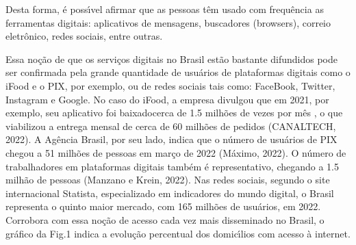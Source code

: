 \documentclass[
12pt,		%
openright,	%
twoside,  %
a4paper,			%
chapter=TITLE,		%
english,			%
french,				%
spanish,			%
brazil				%
]{USPSC-classe/USPSC}
\begin{document}
Desta forma, \'e poss\'{\i}vel afirmar que as pessoas t\^em usado com frequ\^encia  as ferramentas digitais: aplicativos de mensagens, buscadores (browsers), correio eletr\^onico, redes sociais, entre outras.

















Essa no\c{c}\~ao de que os servi\c{c}os digitais no Brasil est\~ao bastante difundidos pode ser confirmada pela grande quantidade de usu\'arios de plataformas digitais como o iFood e o PIX, por exemplo, ou de redes sociais tais como: FaceBook, Twitter, Instagram e Google. No caso do iFood, a empresa divulgou que em 2021, por exemplo, seu aplicativo foi \textquotedbl baixado\textquotedbl  cerca de 1.5 milh\~oes de vezes por m\^es , o que viabilizou a entrega mensal de cerca de 60 milh\~oes de pedidos  (CANALTECH, 2022). A Ag\^encia Brasil, por seu lado, indica que o n\'umero de usu\'arios de PIX chegou a 51 milh\~oes de pessoas em mar\c{c}o de 2022 (M\'aximo, 2022). O n\'umero de trabalhadores em plataformas digitais tamb\'em \'e representativo, chegando a 1.5 milh\~ao de pessoas  (Manzano e Krein, 2022). Nas redes sociais, segundo o site internacional Statista, especializado em indicadores do mundo digital, o Brasil representa o quinto maior mercado, com 165 milh\~oes de usu\'arios, em 2022. Corrobora com essa no\c{c}\~ao de acesso cada vez mais disseminado no Brasil, o gr\'afico da Fig.1 indica a evolu\c{c}\~ao percentual dos domic\'{\i}lios com acesso \`a internet.
\end{document}
